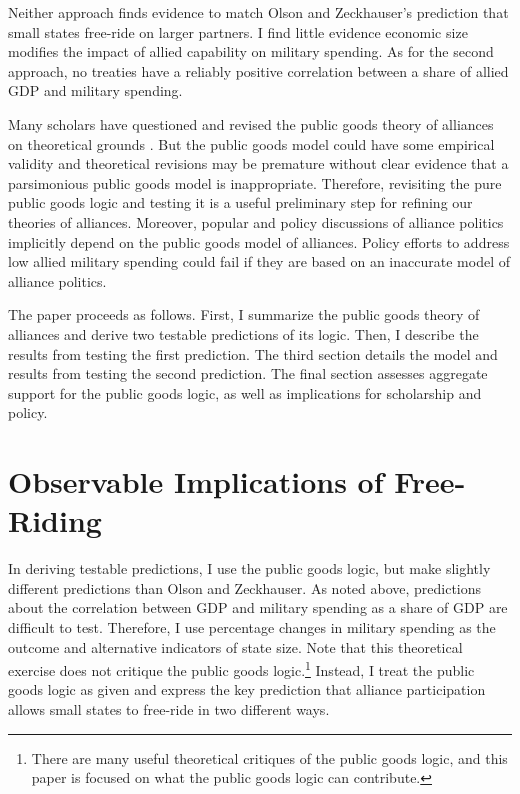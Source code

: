 \documentclass[12pt]{article}
\begin{document}
Neither approach finds evidence to match Olson and Zeckhauser's prediction that small states free-ride on larger partners. 
I find little evidence economic size modifies the impact of allied capability on military spending.
As for the second approach, no treaties have a reliably positive correlation between a share of allied GDP and military spending. 


Many scholars have questioned and revised the public goods theory of alliances on theoretical grounds \citep{Palmer1990, SandlerHartley2001, Norrlof2010}. 
But the public goods model could have some empirical validity and theoretical revisions may be premature without clear evidence that a parsimonious public goods model is inappropriate.
Therefore, revisiting the pure public goods logic and testing it is a useful preliminary step for refining our theories of alliances. 
Moreover, popular and policy discussions of alliance politics implicitly depend on the public goods model of alliances. 
Policy efforts to address low allied military spending could fail if they are based on an inaccurate model of alliance politics. 


The paper proceeds as follows.
First, I summarize the public goods theory of alliances and derive two testable predictions of its logic.
Then, I describe the results from testing the first prediction.
The third section details the model and results from testing the second prediction. 
The final section assesses aggregate support for the public goods logic, as well as implications for scholarship and policy. 



\section{Observable Implications of Free-Riding}

In deriving testable predictions, I use the public goods logic, but make slightly different predictions than Olson and Zeckhauser.
As noted above, predictions about the correlation between GDP and military spending as a share of GDP are difficult to test. 
Therefore, I use percentage changes in military spending as the outcome and alternative indicators of state size. 
Note that this theoretical exercise does not critique the public goods logic.\footnote{There are many useful theoretical critiques of the public goods logic, and this paper is focused on what the public goods logic can contribute.} 
Instead, I treat the public goods logic as given and express the key prediction that alliance participation allows small states to free-ride in two different ways. 
\end{document}
